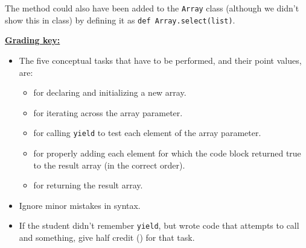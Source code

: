\documentclass[11pt,fleqn]{article}
\begin{document}
\begin{enumerate}
          The method could also have been added to the \texttt{Array} class
          (although we didn't show this in class) by defining it as
          \texttt{def Array.select(list)}.

          \begin{info}{\textbf{\underline{Grading key:}}}

            \begin{itemize}

              \addtolength{\itemsep}{1mm}

              \item The five conceptual tasks that have to be performed, and
                    their point values, are:

                    \begin{itemize}

                      \addtolength{\itemsep}{1mm}

                      \item {} for declaring and initializing
                            a new array.

                      \item {} for iterating across the array
                            parameter.

                      \item {} for calling \texttt{yield} to test
                            each element of the array parameter.

                      \item {} for properly adding each element
                            for which the code block returned true to the
                            result array (in the correct order).

                      \item {} for returning the result array.

                    \end{itemize}

                    \smallskip

              \item Ignore minor mistakes in syntax.

              \item If the student didn't remember \texttt{yield}, but wrote
                    code that attempts to call and something, give half
                    credit () for that task.


\end{itemize}
\end{info}
\end{enumerate}
\end{document}
